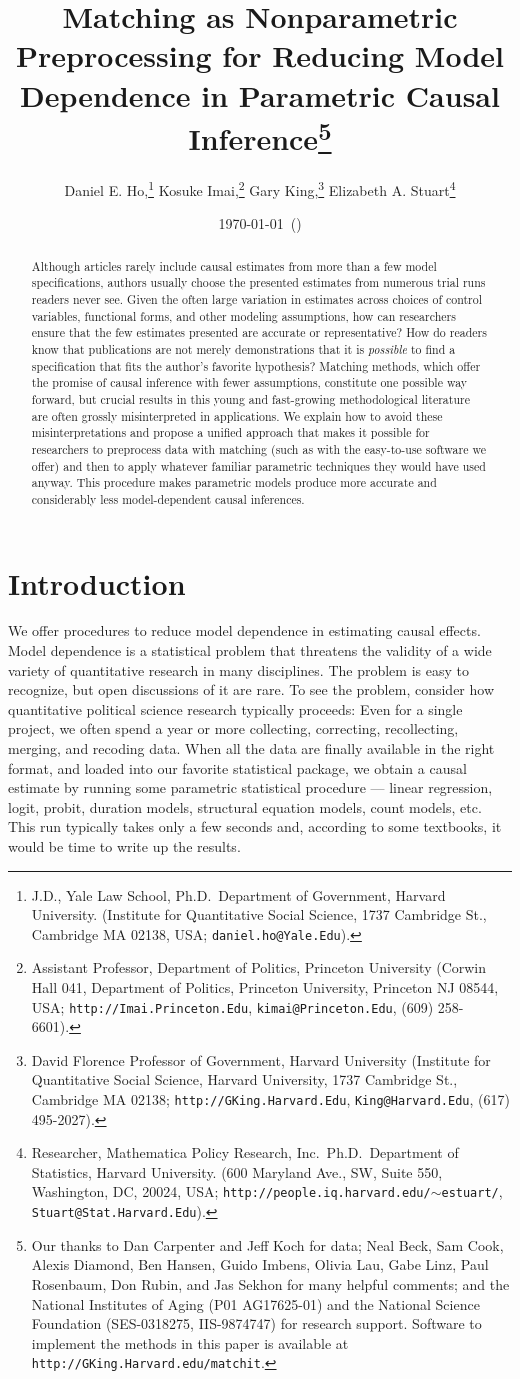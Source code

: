 \documentclass[11pt,titlepage]{article}
\title{Matching as Nonparametric Preprocessing for Reducing Model
  Dependence in Parametric Causal Inference\thanks{Our thanks to Dan
    Carpenter and Jeff Koch for data; Neal Beck, Sam Cook, Alexis
    Diamond, Ben Hansen, Guido Imbens, Olivia Lau, Gabe Linz, Paul
    Rosenbaum, Don Rubin, and Jas Sekhon for many helpful comments;
    and the National Institutes of Aging (P01 AG17625-01) and the
    National Science Foundation (SES-0318275, IIS-9874747) for
    research support.  Software to implement the methods in this paper
    is available at \texttt{http://GKing.Harvard.edu/matchit}.}}
\author{Daniel E. Ho,\thanks{J.D., Yale Law School, Ph.D.\, Department
    of Government, Harvard University. (Institute for Quantitative
    Social Science, 1737 Cambridge St., Cambridge MA 02138, USA;
    \texttt{daniel.ho@Yale.Edu}).}
  Kosuke Imai,\thanks{Assistant Professor, Department of Politics,
    Princeton University (Corwin Hall 041, Department of Politics,
    Princeton University, Princeton NJ 08544, USA;
    \texttt{http://Imai.Princeton.Edu}, \texttt{kimai@Princeton.Edu},
    (609) 258-6601).}
  Gary King,\thanks{David Florence Professor of Government, Harvard
    University (Institute for Quantitative Social Science, Harvard
    University, 1737 Cambridge St., Cambridge MA 02138;
    \texttt{http://GKing.Harvard.Edu}, \texttt{King@Harvard.Edu},
    (617) 495-2027).}
Elizabeth A. Stuart\thanks{Researcher, Mathematica Policy Research,
  Inc.\, Ph.D.\, Department of Statistics, Harvard University.
  (600 Maryland Ave., SW, Suite 550,  Washington, DC, 20024, USA;
  \texttt{http://people.iq.harvard.edu/$\sim$estuart/},
  \texttt{Stuart@Stat.Harvard.Edu}).}}
\date{\today\ (\printtime)}
\begin{document}
\maketitle
{}\baselineskip

\begin{abstract}
  Although articles rarely include causal estimates from more than a
  few model specifications, authors usually choose the presented
  estimates from numerous trial runs readers never see.  Given the
  often large variation in estimates across choices of control
  variables, functional forms, and other modeling assumptions, how can
  researchers ensure that the few estimates presented are accurate or
  representative?  How do readers know that publications are not
  merely demonstrations that it is \emph{possible} to find a
  specification that fits the author's favorite hypothesis?  Matching
  methods, which offer the promise of causal inference with fewer
  assumptions, constitute one possible way forward, but crucial
  results in this young and fast-growing methodological literature are
  often grossly misinterpreted in applications.  We explain how to
  avoid these misinterpretations and propose a unified approach that
  makes it possible for researchers to preprocess data with matching
  (such as with the easy-to-use software we offer) and then to apply
  whatever familiar parametric techniques they would have used anyway.
  This procedure makes parametric models produce more accurate and
  considerably less model-dependent causal inferences.
\end{abstract}

\section{Introduction}

We offer procedures to reduce model dependence in estimating causal
effects.  Model dependence is a statistical problem that threatens the
validity of a wide variety of quantitative research in many
disciplines.  The problem is easy to recognize, but open discussions
of it are rare.  To see the problem, consider how quantitative
political science research typically proceeds: Even for a single
project, we often spend a year or more collecting, correcting,
recollecting, merging, and recoding data.  When all the data are
finally available in the right format, and loaded into our favorite
statistical package, we obtain a causal estimate by running some
parametric statistical procedure --- linear regression, logit, probit,
duration models, structural equation models, count models, etc.  This
run typically takes only a few seconds and, according to some
textbooks, it would be time to write up the results.
\end{document}
